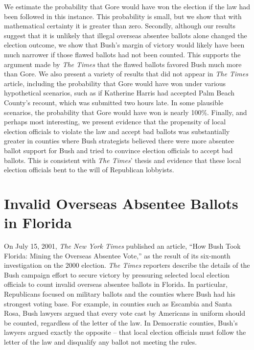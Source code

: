 \documentclass[11pt,titlepage]{article}
\begin{document}
We estimate the probability that Gore would have won the election if
the law had been followed in this instance.  This probability is
small, but we show that with mathematical certainty it is greater than
zero.  Secondly, although our results suggest that it is unlikely
that illegal overseas absentee ballots alone changed the election
outcome, we show that Bush's margin of victory would likely have been
much narrower if those flawed ballots had not been counted.  This
supports the argument made by \emph{The Times} that the flawed ballots
favored Bush much more than Gore.  We also present a variety of
results that did not appear in \emph{The Times} article, including the
probability that Gore would have won under various hypothetical
scenarios, such as if Katherine Harris had accepted Palm Beach
County's recount, which was submitted two hours late.  In some
plausible scenarios, the probability that Gore would have won is
nearly 100\%.  Finally, and perhaps most interesting, we present
evidence that the propensity of local election officials to violate
the law and accept bad ballots was substantially greater in counties
where Bush strategists believed there were more absentee ballot
support for Bush and tried to convince election officials to accept
bad ballots.  This is consistent with \emph{The Times}' thesis and
evidence that these local election officials bent to the will of
Republican lobbyists.

\section{Invalid Overseas Absentee Ballots in Florida} \label{s:ballots}

On July 15, 2001, \textit{The New York Times} published an article,
``How Bush Took Florida: Mining the Overseas Absentee Vote,'' as the
result of its six-month investigation on the 2000 election.  \emph{The
  Times} reporters describe the details of the Bush campaign effort to
secure victory by pressuring selected local election officials to
count invalid overseas absentee ballots in Florida.  In particular,
Republicans focused on military ballots and the counties where Bush
had his strongest voting base.  For example, in counties such as
Escambia and Santa Rosa, Bush lawyers argued that every vote cast by
Americans in uniform should be counted, regardless of the letter of
the law.  In Democratic counties, Bush's lawyers argued exactly the
opposite -- that local election officials must follow the letter of
the law and disqualify any ballot not meeting the rules.
\end{document}
